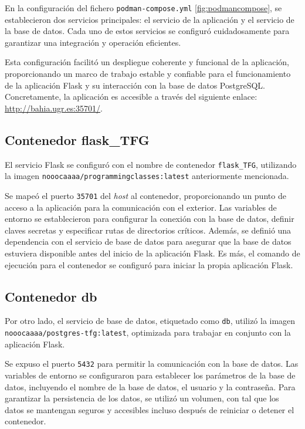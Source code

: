 En la configuración del fichero \texttt{podman-compose.yml} \ref{fig:podmancompose}, se establecieron dos servicios principales: el servicio de la aplicación y el servicio de la base de datos. Cada uno de estos servicios se configuró cuidadosamente para garantizar una integración y operación eficientes. 

Esta configuración facilitó un despliegue coherente y funcional de la aplicación, proporcionando un marco de trabajo estable y confiable para el funcionamiento de la aplicación Flask y su interacción con la base de datos PostgreSQL. Concretamente, la aplicación es accesible a través del siguiente enlace: \href{http://bahia.ugr.es:35701/}{http://bahia.ugr.es:35701/}.

\subsection{Contenedor flask\_TFG}

El servicio Flask se configuró con el nombre de contenedor \texttt{flask\_TFG}, utilizando la imagen \texttt{nooocaaaa/programmingclasses:latest} anteriormente mencionada.  

Se mapeó el puerto \texttt{35701} del \textit{host} al contenedor, proporcionando un punto de acceso a la aplicación para la comunicación con el exterior. Las variables de entorno se establecieron para configurar la conexión con la base de datos, definir claves secretas y especificar rutas de directorios críticos. Además, se definió una dependencia con el servicio de base de datos para asegurar que la base de datos estuviera disponible antes del inicio de la aplicación Flask. Es más, el comando de ejecución para el contenedor se configuró para iniciar la propia aplicación Flask.

\subsection{Contenedor db}

Por otro lado, el servicio de base de datos, etiquetado como \texttt{db}, utilizó la imagen \texttt{nooocaaaa/postgres-tfg:latest}, optimizada para trabajar en conjunto con la aplicación Flask.

Se expuso el puerto \texttt{5432} para permitir la comunicación con la base de datos. Las variables de entorno se configuraron para establecer los parámetros de la base de datos, incluyendo el nombre de la base de datos, el usuario y la contraseña. Para garantizar la persistencia de los datos, se utilizó un volumen, con tal que los datos se mantengan seguros y accesibles incluso después de reiniciar o detener el contenedor.

